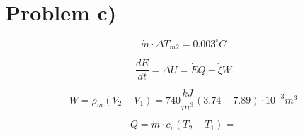 \section*{Problem c)}

\[
\dot{m} \cdot \Delta T_{m2} = 0.003^\circ C
\]

\[
\frac{dE}{dt} = \Delta U = \dot{E}Q - \dot{\xi}W
\]

\[
W = \rho_m (V_2 - V_1) = 740 \frac{kJ}{m^3} (3.74 - 7.89) \cdot 10^{-3} m^3
\]

\[
Q = \dot{m} \cdot c_v (T_2 - T_1) =
\]